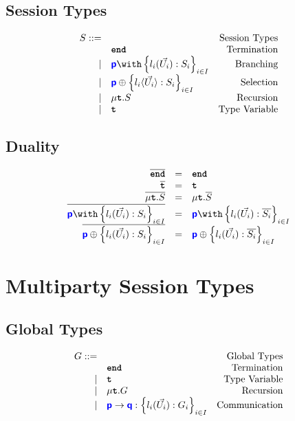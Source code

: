 \documentclass{article}
\begin{document}
\subsection{Session Types}

\doublespacing
\[
\begin{array}{rlr}
    S ::= & & \text{Session Types} \\
     & \tyend & \text{Termination} \\
		\mid & \tybra{p}{l_i(\vec{U_i}): S_i}{i \in I} & \text{Branching} \\
		\mid & \tysel{p}{l_i \langle\vec{U_i}\rangle: S_i}{i \in I} & \text{Selection} \\
		\mid & \tyrec{S} & \text{Recursion} \\
		\mid & \tyrecvar & \text{Type Variable} \\
\end{array}
\]
\singlespacing

\subsection{Duality}
\doublespacing
\[
\begin{array}{rcl}
		\dual{\tyend} & = & \tyend \\
		\dual{\tyrecvar} & = & \tyrecvar \\
		\dual{\tyrec{S}} & = & \tyrec{\dual{S}} \\
		\dual{\tybra{p}{l_i(\vec{U_i}): S_i}{i \in I}} & = & \tybra{p}{l_i(\vec{U_i}): \dual{S_i}}{i \in I} \\
		\dual{\tysel{p}{l_i(\vec{U_i}): S_i}{i \in I}} & = & \tysel{p}{l_i(\vec{U_i}): \dual{S_i}}{i \in I} \\
\end{array}
\]
\singlespacing

\section{Multiparty Session Types}

\subsection{Global Types}

\doublespacing
\[
\begin{array}{rlr}
    G ::= & & \text{Global Types} \\
     & \textbf{\texttt{end}} & \text{Termination} \\
	\mid & \textbf{\texttt{t}} & \text{Type Variable} \\
	\mid & \mu\textbf{\texttt{t}}.{G} & \text{Recursion} \\
	\mid & {\color{blue}\bm{\mathsf{p}}} \to {\color{blue}\bm{\mathsf{q}}} : \left\{ {l_i(\vec{U_i}): G_i} \right\}_{i \in I} & \text{Communication} \\
\end{array}
\]
\singlespacing
\end{document}
